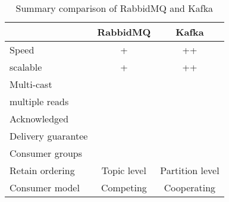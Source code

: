 \begin{table}
\centering
\begin{tabular}{|l||c|c|}\hline
  					& RabbidMQ 			& Kafka 		\\ \hline 
Speed				& + 				& ++ 			\\ \hline
scalable			& +					& ++	 		\\ \hline
Multi-cast			&\xmark				& \cmark		\\ \hline
multiple reads		&\xmark				& \cmark		\\ \hline
Acknowledged		&\cmark				& \xmark		\\ \hline
Delivery guarantee	&\cmark				& \xmark		\\ \hline
Consumer groups		&\cmark				&\cmark			\\ \hline
Retain ordering		&Topic level		& Partition level\\ \hline
Consumer model	 	&Competing			& Cooperating	\\ \hline
\end{tabular}
\caption{Summary comparison of RabbidMQ and Kafka}
\label{table:rabbidmq-kafka}
\end{table}

 
